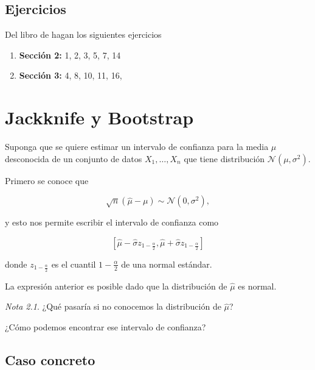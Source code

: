 \documentclass[
  12pt,
]{book}
\providecommand{\tightlist}{%
  \setlength{\itemsep}{0pt}\setlength{\parskip}{0pt}}
\theoremstyle{definition}
\theoremstyle{definition}
\theoremstyle{definition}
\theoremstyle{definition}
\theoremstyle{remark}
\newtheorem*{remark}{Nota}
\begin{document}
\hypertarget{ejercicios}{%
\section{Ejercicios}\label{ejercicios}}

Del libro de \autocite{HardleNonparametric2004} hagan los siguientes ejercicios

\begin{enumerate}
\def\labelenumi{\arabic{enumi}.}
\tightlist
\item
  \textbf{Sección 2:} 1, 2, 3, 5, 7, 14
\item
  \textbf{Sección 3:} 4, 8, 10, 11, 16,
\end{enumerate}

\hypertarget{jackknife-y-bootstrap}{%
\chapter{Jackknife y Bootstrap}\label{jackknife-y-bootstrap}}

Suponga que se quiere estimar un intervalo de confianza para la media
\(\mu\) desconocida de un conjunto de datos \(X_{1},\ldots, X_{n}\)
que tiene distribución \(\mathcal{N}\left(\mu ,\sigma^{2}\right)\).

Primero se conoce que

\begin{equation*}
\sqrt{n}\left( \hat{\mu} - \mu \right)
\sim \mathcal{N}\left(0,\sigma^{2}\right),
\end{equation*}

y esto nos permite escribir el intervalo de confianza como

\begin{equation*}
\left[ \hat{\mu} - \hat{\sigma}z_{1-\frac{\alpha}{2}} ,
\hat{\mu} + \hat{\sigma}z_{1-\frac{\alpha}{2}}\right]
\end{equation*}

donde \(z_{1-\frac{\alpha}{2}}\) es el cuantil \(1-\frac{\alpha}{2}\)
de una normal estándar.

La expresión anterior es posible dado que la distribución de \(\hat{\mu}\) es normal.

\begin{remark}
¿Qué pasaría si no conocemos la distribución de \(\hat{\mu}\)?

¿Cómo podemos encontrar ese intervalo de confianza?
\end{remark}

\hypertarget{caso-concreto}{%
\section{Caso concreto}\label{caso-concreto}}
\end{document}
